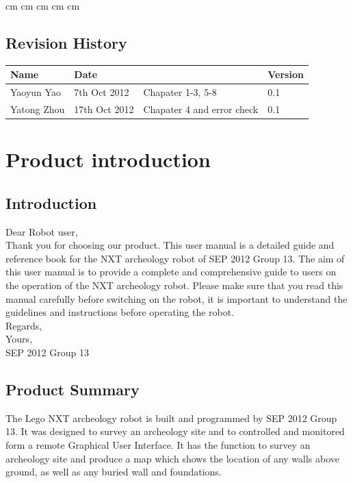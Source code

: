 \documentclass[11pt, a4paper]{report}
\begin{document}
 cm
 cm
 cm
 cm
 cm

\tableofcontents






\clearpage
\section*{Revision History}
\begin{tabular}{| l | l | l | l | }
\hline
Name			& Date			&				&	Version   \\ \hline
Yaoyun Yao		& 7th Oct 2012		&Chapater 1-3, 5-8	&	0.1       \\ \hline
Yatong Zhou	& 17th Oct 2012		&Chapater 4 and error check &	0.1       \\ \hline


\end{tabular}
\clearpage


\chapter{Product introduction}
\section{Introduction}
Dear Robot user,\\
Thank you for choosing our product. This user manual is a detailed guide and reference book for the NXT archeology robot of SEP 2012 Group 13. The aim of this user manual is to provide a complete and comprehensive guide to users on the operation of the NXT archeology robot. Please make sure that you read this manual carefully before switching on the robot, it is important to understand the guidelines and instructions before operating the robot.\\
Regards,\\
Yours,\\ 
\flushright SEP 2012 Group 13
\flushleft

\section{Product Summary}
The Lego NXT archeology robot is built and programmed by SEP 2012 Group 13. It was designed to survey an archeology site and to controlled and monitored form a remote Graphical User Interface.  It has the function to survey an archeology site and produce a map which shows the location of any walls above ground, as well as any buried wall and foundations.
\end{document}
